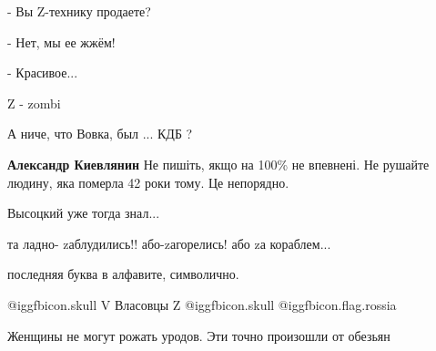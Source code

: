 \begin{itemize}
- Вы Z-технику продаете?

- Нет, мы ее жжём!

- Красивое...

Z - zombi

А ниче, что Вовка, был ... КДБ ?

\textbf{Александр Киевлянин}
Не пишіть, якщо на 100\% не впевнені. Не рушайте людину, яка померла 42 роки тому. Це непорядно.

Высоцкий уже тогда знал...

та ладно- zаблудились!! або-zагорелись! або zа кораблем...

последняя буква в алфавите, символично.

 @igg{fbicon.skull}  V Власовцы Z  @igg{fbicon.skull} @igg{fbicon.flag.rossia}

Женщины не могут рожать уродов. Эти точно произошли от обезьян

\end{itemize} %
